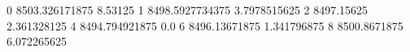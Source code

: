 0 8503.326171875 8.53125
1 8498.5927734375 3.7978515625
2 8497.15625 2.361328125
4 8494.794921875 0.0
6 8496.13671875 1.341796875
8 8500.8671875 6.072265625
